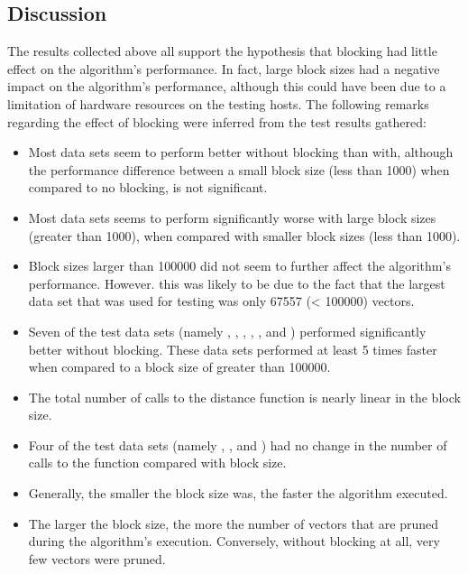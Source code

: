 \subsection{Discussion}
\label{algorithmPerformance:discussion}
The results collected above all support the hypothesis that blocking had little
effect on the  algorithm's performance. In
fact, large block sizes had a negative impact on the algorithm's performance,
although this could have been due to a limitation of hardware resources on the
testing hosts. The following remarks regarding the effect of blocking were
inferred from the test results gathered:
\begin{itemize}
    \item Most data sets seem to perform better without blocking than with,
        although the performance difference between a small block size (less
        than 1000) when compared to no blocking, is not significant.
    \item Most data sets seems to perform significantly worse with large block
        sizes (greater than 1000), when compared with smaller block sizes (less
        than 1000).
    \item Block sizes larger than 100000 did not seem to further affect the
        algorithm's performance. However. this was likely to be due to the fact
        that the largest data set that was used for testing was only 67557
        (< 100000) vectors.
    \item Seven of the test data sets (namely ,
        , , ,
        ,  and )
        performed significantly better without blocking. These data sets
        performed at least 5 times faster when compared to a block size of
        greater than 100000.
    \item The total number of calls to the distance function is nearly linear in
        the block size.
    \item Four of the test data sets (namely ,
        ,  and ) had no
        change in the number of calls to the  function
        compared with block size.
    \item Generally, the smaller the block size was, the faster the algorithm
        executed.
    \item The larger the block size, the more the number of vectors that are
        pruned during the algorithm's execution. Conversely, without blocking at
        all, very few vectors were pruned.
\end{itemize}


